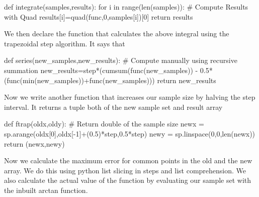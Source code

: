 \documentclass[canadian]{article}
\begin{document}
\nwenddocs{}\endmoddef\nwstartdeflinemarkup\nwenddeflinemarkup

def integrate(samples,results):
        for i in range(len(samples)):
        # Compute Results with Quad
            results[i]=quad(func,0,samples[i])[0]
        return results
\nwendcode{}\nwdocspar

%
We then declare the function that calculates the above integral using
the trapezoidal step algorithm. It says that

\nwenddocs{}\endmoddef\nwstartdeflinemarkup\nwenddeflinemarkup

def series(new_samples,new_results):
    # Compute manually using recursive summation
    new_results=step*(cumsum(func(new_samples)) - 0.5*(func(min(new_samples))+func(new_samples)))
    return new_results
\nwendcode{}\nwdocspar

%
Now we write another function that increases our sample size by halving
the step interval. It returns a tuple both of the new sample set and
result array

\nwenddocs{}\endmoddef\nwstartdeflinemarkup\nwenddeflinemarkup

def ftrap(oldx,oldy):
    # Return double of the sample size
    newx = sp.arange(oldx[0],oldx[-1]+(0.5)*step,0.5*step)
    newy = sp.linspace(0,0,len(newx))
    return (newx,newy)
\nwendcode{}\nwdocspar

%
Now we calculate the maximum error for common points in the old and
the new array. We do this using python list slicing in steps and list
comprehension. We also calculate the actual value of the function
by evaluating our sample set with the inbuilt arctan function.

\nwenddocs{}\endmoddef\nwstartdeflinemarkup\nwenddeflinemarkup
\end{document}
